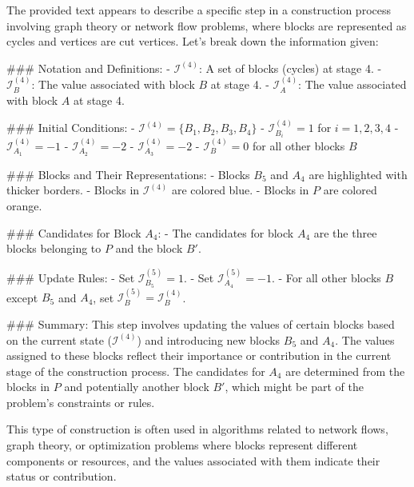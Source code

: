 The provided text appears to describe a specific step in a construction process involving graph theory or network flow problems, where blocks are represented as cycles and vertices are cut vertices. Let's break down the information given:

### Notation and Definitions:
- \( \mathcal{I}^{(4)} \): A set of blocks (cycles) at stage 4.
- \( \mathcal{I}^{(4)}_B \): The value associated with block \( B \) at stage 4.
- \( \mathcal{I}^{(4)}_A \): The value associated with block \( A \) at stage 4.

### Initial Conditions:
- \( \mathcal{I}^{(4)} = \{B_1, B_2, B_3, B_4\} \)
- \( \mathcal{I}^{(4)}_{B_i} = 1 \) for \( i = 1, 2, 3, 4 \)
- \( \mathcal{I}^{(4)}_{A_1} = -1 \)
- \( \mathcal{I}^{(4)}_{A_2} = -2 \)
- \( \mathcal{I}^{(4)}_{A_3} = -2 \)
- \( \mathcal{I}^{(4)}_{B} = 0 \) for all other blocks \( B \)

### Blocks and Their Representations:
- Blocks \( B_5 \) and \( A_4 \) are highlighted with thicker borders.
- Blocks in \( \mathcal{I}^{(4)} \) are colored blue.
- Blocks in \( P \) are colored orange.

### Candidates for Block \( A_4 \):
- The candidates for block \( A_4 \) are the three blocks belonging to \( P \) and the block \( B' \).

### Update Rules:
- Set \( \mathcal{I}^{(5)}_{B_5} = 1 \).
- Set \( \mathcal{I}^{(5)}_{A_4} = -1 \).
- For all other blocks \( B \) except \( B_5 \) and \( A_4 \), set \( \mathcal{I}^{(5)}_{B} = \mathcal{I}^{(4)}_{B} \).

### Summary:
This step involves updating the values of certain blocks based on the current state (\( \mathcal{I}^{(4)} \)) and introducing new blocks \( B_5 \) and \( A_4 \). The values assigned to these blocks reflect their importance or contribution in the current stage of the construction process. The candidates for \( A_4 \) are determined from the blocks in \( P \) and potentially another block \( B' \), which might be part of the problem's constraints or rules.

This type of construction is often used in algorithms related to network flows, graph theory, or optimization problems where blocks represent different components or resources, and the values associated with them indicate their status or contribution.